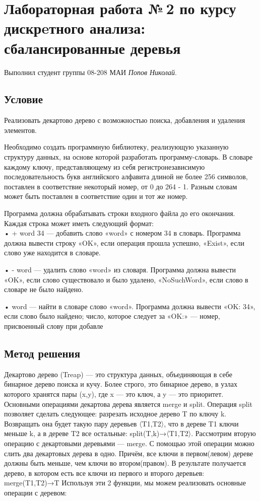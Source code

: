 \documentclass[12pt]{article}
\begin{document}
\section*{Лабораторная работа №\,2 по курсу дискрeтного анализа: сбалансированные деревья}

Выполнил студент группы 08-208 МАИ \textit{Попов Николай}.

\subsection*{Условие}


Реализовать декартово дерево с возможностью поиска, добавления и удаления элементов.

Необходимо создать программную библиотеку, реализующую указанную структуру данных, на основе которой разработать программу-словарь. В словаре каждому ключу, представляющему из себя регистронезависимую последовательность букв английского алфавита длиной не более 256 символов, поставлен в соответствие некоторый номер, от 0 до 264 - 1. Разным словам может быть поставлен в соответствие один и тот же номер.

Программа должна обрабатывать строки входного файла до его окончания. Каждая строка может иметь следующий формат: \\

• + word 34 — добавить слово «word» с номером 34 в словарь. Программа должна вывести строку «OK», если операция прошла успешно, «Exist», если слово уже находится в словаре.

• - word — удалить слово «word» из словаря. Программа должна вывести «OK», если слово существовало и было удалено, «NoSuchWord», если слово в словаре не было найдено.

• word — найти в словаре слово «word». Программа должна вывести «OK: 34», если слово было найдено; число, которое следует за «OK:» — номер, присвоенный слову при добавле



\subsection*{Метод решения}

Декартово дерево (Treap) — это структура данных, объединяющая в себе бинарное
дерево поиска и кучу. Более строго, это бинарное дерево, в узлах которого хранятся
пары (x,y), где x — это ключ, а y — это приоритет. Основными операциями декартова
дерева является merge и split.
Операция split позволяет сделать следующее: разрезать исходное дерево T по ключу k.
Возвращать она будет такую пару деревьев 〈T1,T2〉, что в дереве T1 ключи меньше k,
а в дереве T2 все остальные: split(T,k)→〈T1,T2〉.
Рассмотрим вторую операцию с декартовыми деревьями — merge. С помощью этой
операции можно слить два декартовых дерева в одно. Причём, все ключи в первом(левом)
дереве должны быть меньше, чем ключи во втором(правом). В результате получается
дерево, в котором есть все ключи из первого и второго деревьев: merge(T1,T2)→T
Используя эти 2 функции, мы можем реализовать основные операции с деревом:\\
\end{document}
